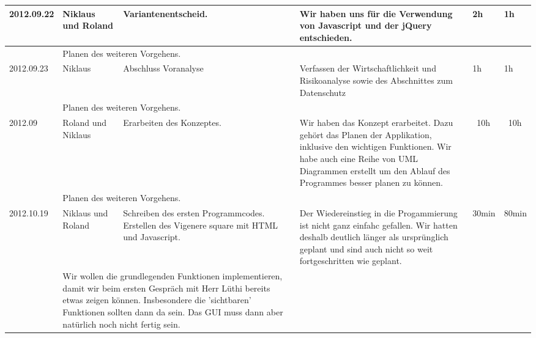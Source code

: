 \documentclass[11pt,paper=a4,final]{scrartcl}
\begin{document}
\begin{landscape}
\begin{longtable}{|p{1.8cm}|p{1.5cm}|p{5.0cm}|p{11.0cm}|l|l|}
    2012.09.22 & Niklaus und Roland &
    Variantenentscheid.&
    Wir haben uns f\"ur die Verwendung von Javascript und der jQuery
    entschieden.&
    2h & 1h \\ \hline \nopagebreak
    \multicolumn{2}{|l|}{\bf Pendenzen} &\multicolumn{2}{p{16.0cm}|}{Planen des weiteren Vorgehens.}  & \multicolumn{2}{l|}{} \\ \hline
    2012.09.23 & Niklaus &
    Abschluss Voranalyse&
    Verfassen der Wirtschaftlichkeit und Risikoanalyse sowie des Abschnittes zum
    Datenschutz &
    1h & 1h \\ \hline \nopagebreak
    \multicolumn{2}{|l|}{\bf Pendenzen} &\multicolumn{2}{p{16.0cm}|}{Planen des weiteren Vorgehens.}  & \multicolumn{2}{l|}{} \\ \hline
    2012.09 & Roland und Niklaus &
    Erarbeiten des Konzeptes.&
    Wir haben das Konzept erarbeitet. Dazu geh\"ort das Planen der Applikation,
    inklusive den wichtigen Funktionen. Wir habe auch eine Reihe von UML
    Diagrammen erstellt um den Ablauf des Programmes besser planen zu k\"onnen.&
    ~10h & ~10h \\ \hline \nopagebreak
    \multicolumn{2}{|l|}{\bf Pendenzen} &\multicolumn{2}{p{16.0cm}|}{Planen des weiteren Vorgehens.}  & \multicolumn{2}{l|}{} \\ \hline
    \hline
    2012.10.19 & Niklaus und Roland &
    Schreiben des ersten Programmcodes. Erstellen des Vigenere square mit HTML und Javascript. &
    Der Wiedereinstieg in die Progammierung ist nicht ganz einfahc gefallen. Wir hatten deshalb deutlich l\"anger als urspr\"unglich geplant und sind auch nicht so weit fortgeschritten wie geplant. &
    30min & 80min \\ \hline \nopagebreak
    \multicolumn{2}{|l|}{\bf Pendenzen} &\multicolumn{2}{p{16.0cm}|}{Wir wollen die grundlegenden Funktionen implementieren, damit wir beim ersten Gespr\"ach mit Herr L\"uthi bereits etwas zeigen k\"onnen. Insbesondere die 'sichtbaren' Funktionen sollten dann da sein. Das GUI muss dann aber nat\"urlich noch nicht fertig sein.}  & \multicolumn{2}{l|}{} \\ \hline

\end{longtable}
\end{landscape}
\end{document}

